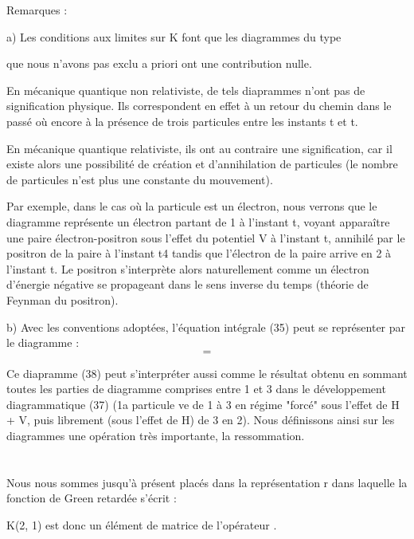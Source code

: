 Remarques :

a) Les conditions aux limites sur K font que les diagrammes du type

que nous n'avons pas exclu a priori ont une contribution nulle.

En mécanique quantique non relativiste, de tels diaprammes n'ont
pas de signification physique. Ils correspondent en effet à un retour du
chemin dans le passé où encore à la présence de trois particules entre les
instants t et t.

En mécanique quantique relativiste, ils ont au contraire une
signification, car il existe alors une possibilité de création et d'annihilation
de particules (le nombre de particules n'est plus une constante
du mouvement).

Par exemple, dans le cas où la particule est un électron, nous
verrons que le diagramme représente un électron partant de 1 à l'instant t,
voyant apparaître une paire électron-positron sous l'effet du potentiel V
à l'instant t, annihilé par le positron de la paire à l'instant t4 tandis
que l'électron de la paire arrive en 2 à l'instant t. Le positron s'interprète
alors naturellement comme un électron d'énergie négative se propageant
dans le sens inverse du temps (théorie de Feynman du positron).

b) Avec les conventions adoptées, l'équation intégrale (35) peut se
représenter par le diagramme :
\[
\tag{38}=
\]

Ce diapramme (38) peut s'interpréter aussi comme le résultat obtenu en
sommant toutes les parties de diagramme comprises entre 1 et 3 dans le
développement diagrammatique (37) (1a particule ve de 1 à 3 en régime
"forcé" sous l'effet de H + V, puis librement (sous l'effet de H) de
3 en 2). Nous définissons ainsi sur les diagrammes une opération très
importante, la ressommation.

\section{}%

\subsection{}%

Nous nous sommes jusqu'à présent placés dans la représentation r
dans laquelle la fonction de Green retardée s'écrit :

K(2, 1) est donc un élément de matrice de l'opérateur .

